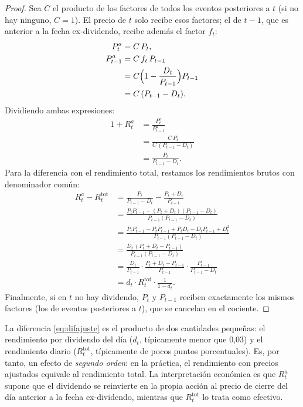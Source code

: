 \begin{proof}
Sea $C$ el producto de los factores de todos los eventos posteriores a $t$ (si no hay ninguno, $C=1$).
El precio de $t$ solo recibe esos factores; el de $t-1$, que es anterior a la fecha ex-dividendo, recibe
además el factor $f_t$:
\begin{align*}
  P^{a}_t     &= C\,P_t,\\
  P^{a}_{t-1} &= C\,f_t\,P_{t-1}\\
              &= C\Bigl(1-\frac{D_t}{P_{t-1}}\Bigr)P_{t-1}\\
              &= C\,(P_{t-1}-D_t).
\end{align*}
Dividiendo ambas expresiones:
\begin{align*}
  1+R^{a}_t &= \frac{P^{a}_t}{P^{a}_{t-1}}\\
            &= \frac{C\,P_t}{C\,(P_{t-1}-D_t)}\\
            &= \frac{P_t}{P_{t-1}-D_t}.
\end{align*}
Para la diferencia con el rendimiento total, restamos los rendimientos brutos con denominador común:
\begin{align*}
  R^{a}_t-R^{\mathrm{tot}}_t
    &= \frac{P_t}{P_{t-1}-D_t}-\frac{P_t+D_t}{P_{t-1}}\\
    &= \frac{P_tP_{t-1}-(P_t+D_t)(P_{t-1}-D_t)}{P_{t-1}(P_{t-1}-D_t)}\\
    &= \frac{P_tP_{t-1}-P_tP_{t-1}+P_tD_t-D_tP_{t-1}+D_t^2}{P_{t-1}(P_{t-1}-D_t)}\\
    &= \frac{D_t\,(P_t+D_t-P_{t-1})}{P_{t-1}(P_{t-1}-D_t)}\\
    &= \frac{D_t}{P_{t-1}}\cdot\frac{P_t+D_t-P_{t-1}}{P_{t-1}}\cdot\frac{P_{t-1}}{P_{t-1}-D_t}\\
    &= d_t\cdot R^{\mathrm{tot}}_t\cdot\frac{1}{1-d_t}.
\end{align*}
Finalmente, si en $t$ no hay dividendo, $P_t$ y $P_{t-1}$ reciben exactamente los mismos factores (los de
eventos posteriores a $t$), que se cancelan en el cociente.
\end{proof}

\begin{observacion}
La diferencia \eqref{eq:difajuste} es el producto de dos cantidades pequeñas: el rendimiento por
dividendo del día ($d_t$, típicamente menor que 0,03) y el rendimiento diario ($R^{\mathrm{tot}}_t$,
típicamente de pocos puntos porcentuales). Es, por tanto, un efecto de \emph{segundo orden}: en la
práctica, el rendimiento con precios ajustados equivale al rendimiento total. La interpretación
económica es que $R^a_t$ supone que el dividendo se reinvierte en la propia acción al precio de cierre
del día anterior a la fecha ex-dividendo, mientras que $R^{\mathrm{tot}}_t$ lo trata como efectivo.
\end{observacion}

